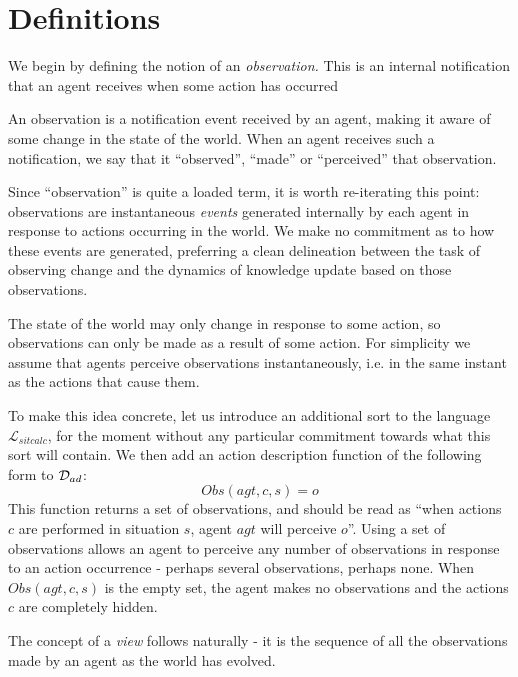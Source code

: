 \section{Definitions}

We begin by defining the notion of an \emph{observation.} This is
an internal notification that an agent receives when some action has
occurred

\begin{defnL}
[{Observations}] An observation is a notification event received
by an agent, making it aware of some change in the state of the world.
When an agent receives such a notification, we say that it {}``observed'',
{}``made'' or {}``perceived'' that observation. 
\end{defnL}
Since {}``observation'' is quite a loaded term, it is worth re-iterating
this point: observations are instantaneous \emph{events} generated
internally by each agent in response to actions occurring in the world.
We make no commitment as to how these events are generated, preferring
a clean delineation between the task of observing change and the dynamics
of knowledge update based on those observations.

The state of the world may only change in response to some action,
so observations can only be made as a result of some action. For simplicity
we assume that agents perceive observations instantaneously, i.e.
in the same instant as the actions that cause them.

To make this idea concrete, let us introduce an additional sort 
to the language $\mathcal{L}_{sitcalc}$, for the moment without any
particular commitment towards what this sort will contain. We then
add an action description function of the following form to $\mathcal{D}_{ad}$:\[
Obs(agt,c,s)=o\]
 This function returns a set of observations, and should be read as
{}``when actions $c$ are performed in situation $s$, agent $agt$
will perceive $o$''. Using a set of observations allows an agent
to perceive any number of observations in response to an action occurrence
- perhaps several observations, perhaps none. When $Obs(agt,c,s)$
is the empty set, the agent makes no observations and the actions
$c$ are completely hidden.

The concept of a \emph{view} follows naturally - it is the sequence
of all the observations made by an agent as the world has evolved.

